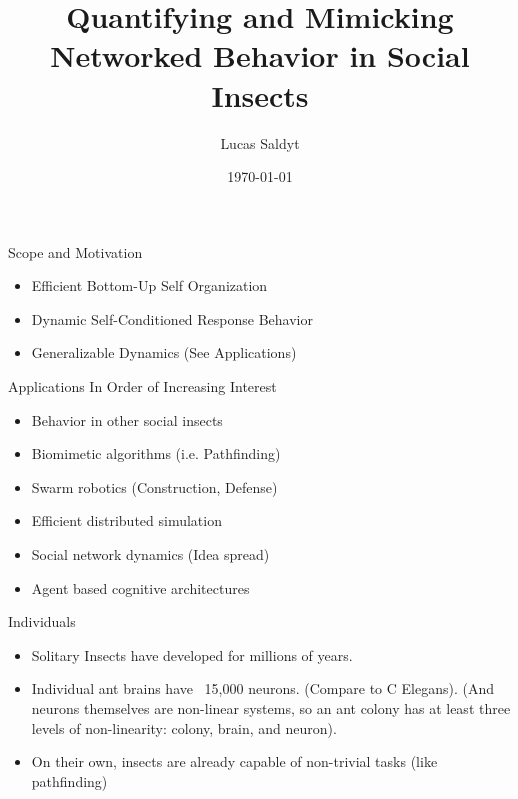\documentclass{beamer}
\title{Quantifying and Mimicking Networked Behavior in Social Insects}
\date{\today}
\author{Lucas Saldyt}
\institute{Arizona State University}
\begin{document}
  \maketitle
  \begin{frame}{Scope and Motivation}
      \begin{itemize}
          \item Efficient Bottom-Up Self Organization
          \item Dynamic Self-Conditioned Response Behavior
          \item Generalizable Dynamics \tiny (See Applications) \\
      \end{itemize}
  \end{frame}

  \begin{frame}{Applications In Order of Increasing Interest}
      \begin{itemize}
          \item Behavior in other social insects
          \item Biomimetic algorithms (i.e. Pathfinding)
          \item Swarm robotics (Construction, Defense)
          \item Efficient distributed simulation
          \item Social network dynamics (Idea spread)
          \item Agent based cognitive architectures
      \end{itemize}
  \end{frame}

  \begin{frame}{Individuals}
      \begin{itemize}
          \item Solitary Insects have developed for millions of years.
          \item Individual ant brains have ~15,000 neurons. (Compare to C Elegans). \newline
              \tiny (And neurons themselves are non-linear systems, so an ant colony has at least three levels of non-linearity: colony, brain, and neuron). \normalsize
          \item On their own, insects are already capable of non-trivial tasks (like pathfinding)
      \end{itemize}
  \end{frame}
\end{document}
